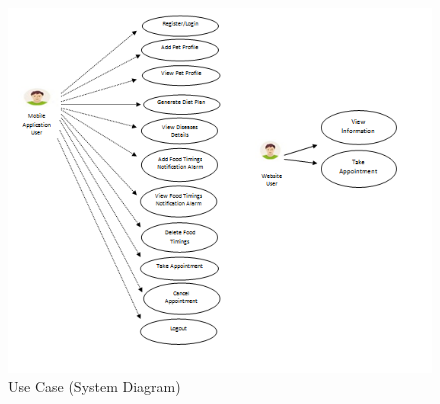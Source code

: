 \begin{figure}[H]
    \centering
    \includegraphics[scale=0.7]{301}
		\caption{Use Case (System Diagram)}
\end{figure}

\newpage
